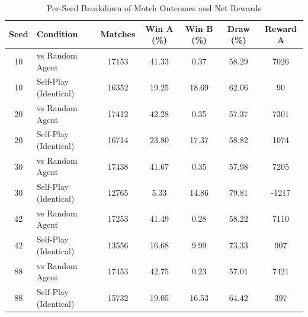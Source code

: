 \begin{table}[htbp]
    \centering
    \caption{Per-Seed Breakdown of Match Outcomes and Net Rewards}
    \label{tab:marl_per_seed}
    \begin{tabular}{clccccc}
        \toprule
        \textbf{Seed} & \textbf{Condition} & \textbf{Matches} & \textbf{Win A (\%)} & \textbf{Win B (\%)} & \textbf{Draw (\%)} & \textbf{Reward A} \\
        \midrule
        10 & vs Random Agent & 17153 & 41.33 & 0.37 & 58.29 & 7026 \\
        10 & Self-Play (Identical) & 16352 & 19.25 & 18.69 & 62.06 & 90 \\
        \midrule
        20 & vs Random Agent & 17412 & 42.28 & 0.35 & 57.37 & 7301 \\
        20 & Self-Play (Identical) & 16714 & 23.80 & 17.37 & 58.82 & 1074 \\
        \midrule
        30 & vs Random Agent & 17438 & 41.67 & 0.35 & 57.98 & 7205 \\
        30 & Self-Play (Identical) & 12765 & 5.33 & 14.86 & 79.81 & -1217 \\
        \midrule
        42 & vs Random Agent & 17253 & 41.49 & 0.28 & 58.22 & 7110 \\
        42 & Self-Play (Identical) & 13556 & 16.68 & 9.99 & 73.33 & 907 \\
        \midrule
        88 & vs Random Agent & 17453 & 42.75 & 0.23 & 57.01 & 7421 \\
        88 & Self-Play (Identical) & 15732 & 19.05 & 16.53 & 64.42 & 397 \\
        \bottomrule
    \end{tabular}
\end{table}
